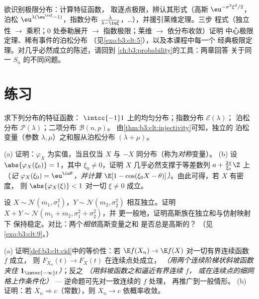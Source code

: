 \begin{method}\label{met:b3:clt:method}
欲识别极限分布：计算特征函数，
取逐点极限，辨认其形式（高斯
$\eu^{-\sigma^2\xi^2/2}$，泊松
$\eu^{\lambda(\eu^{\iu\xi}-1)}$，指数分布 $\frac{\lambda}
{\lambda - \iu\xi}$，\dots），并援引莱维定理。三步
程式（独立性 $\to$ 乘积；$0$ 处泰勒展开 $\to$
指数极限；莱维 $\to$ 依分布收敛）证明
中心极限定理、稀有事件的泊松分布
（见\cref{exo:b3:clt:5}），以及本课程中每一个
经典极限定理。对几乎必然成立的陈述，请回到
\cref{ch:b3:probability}的工具：两章回答
关于同一 $S_n$ 的不同问题。
\end{method}

\section{练习}

\begin{exercise}[$\star$]\label{exo:b3:clt:1}
求下列分布的特征函数：
$\intcc{-1}1$ 上的均匀分布；指数分布 $\mathcal E(\lambda)$；
泊松分布 $\mathcal P(\lambda)$；二项分布 $\mathcal B(n, p)$。
由\cref{thm:b3:clt:injectivity}可知，独立的
泊松变量（参数 $\lambda, \mu$）之和服从泊松分布 $(\lambda +
\mu)$。
\end{exercise}

\begin{exercise}[$\star\star$]\label{exo:b3:clt:2}
(a) 证明：$\varphi_X$ 为实值，当且仅当 $X$
与 $-X$ 同分布（称为\emph{对称}变量）。
(b) 设 $\abs{\varphi_X(\xi_0)} = 1$，其中 $\xi_0 \neq
0$，证明 $X$ 几乎必然支撑于等差数列
$a + \frac{2\pi}{\xi_0}\Z$ 上（\emph{记
$\varphi_X(\xi_0) = \eu^{\iu\theta}$，并计算 $\E[1 -
\cos(\xi_0X - \theta)]$）}。由此可得，若 $X$ 有密度，
则 $\abs{\varphi_X(\xi)} < 1$ 对一切 $\xi \neq 0$ 成立。
\end{exercise}

\begin{exercise}[$\star\star$]\label{exo:b3:clt:3}
设 $X \sim \mathcal N(m_1, \sigma_1^2)$，$Y \sim
\mathcal N(m_2, \sigma_2^2)$ 相互独立。证明 $X + Y
\sim \mathcal N(m_1 + m_2, \sigma_1^2 + \sigma_2^2)$，并
更一般地，证明高斯族在独立和与仿射映射下
保持稳定。对比：两个\emph{相依}高斯变量之和
是否总是高斯的？
（见\cref{exo:b3:clt:9}。）
\end{exercise}

\begin{exercise}[$\star\star$]\label{exo:b3:clt:4}
(a) 证明\cref{def:b3:clt:cid}中的等价性：若
$\E f(X_n) \to \E f(X)$ 对一切有界连续函数 $f$ 成立，
则 $F_{X_n}(t) \to F_X(t)$ 在连续点处成立，
\emph{（用两个连续阶梯状斜坡函数夹住
$\mathbf 1_{\intoc{-\infty}t}$）}；反之
\emph{（用斜坡函数之和逼近有界连续 $f$，
或在连续点的细网格上作条件化）}
--- 逆命题可先对一致连续的 $f$ 处理，
再推广到一般情形。
(b) 证明：若 $X_n \Rightarrow c$（常数），则 $X_n
\to c$ 依概率收敛。
\end{exercise}

